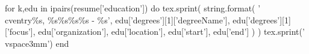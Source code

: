 

\begin{cventries}


  \begin{luacode}
    for k,edu in ipairs(resume['education']) do
      tex.sprint(
        string.format(
          '\\cventry{\%s, \%s}{\%s}{\%s}{\%s - \%s}{}',
          edu['degrees'][1]['degreeName'],
          edu['degrees'][1]['focus'],
          edu['organization'],
          edu['location'],
          edu['start'],
          edu['end']
        )
      )
      tex.sprint('\\vspace{3mm}')
    end
  \end{luacode}


\end{cventries}
